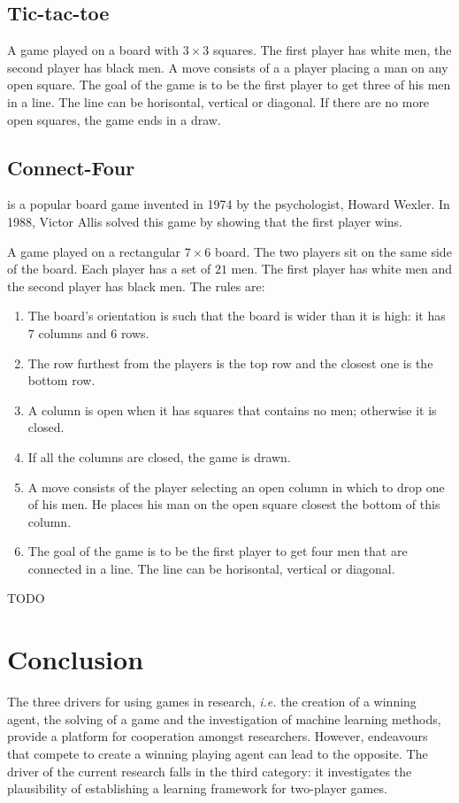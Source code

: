 \subsection{Tic-tac-toe}
 {A game played on a board with $3 \times 3$ squares.  The first player has white men, the second player has black men. A move consists of a a player placing a man on any open square.  The goal of the game is to be the first player to get three of his men in a line.  The line can be horisontal, vertical or diagonal.  If there are no more open squares, the game ends in a draw.}  

\subsection{Connect-Four}
 is a popular board game invented in 1974 by the psychologist, Howard Wexler.  In 1988, Victor Allis\cite{allis:masters} solved this game by showing that the first player wins.  

 {A game played on a rectangular $7 \times 6$ board. The two players sit on the same side of the board. Each player has a set of $21$ men.  The first player has white men and the second player has black men. The rules are:     
\begin{enumerate}
  \item The board's orientation is such that the board is wider than it is high: it has $7$ columns and $6$ rows.  
	\item The row furthest from the players is the top row and the closest one is the bottom row.
	\item A column is open when it has squares that contains no men; otherwise it is closed.
	\item If all the columns are closed, the game is drawn.
	\item A move consists of the player selecting an open column in which to drop one of his men.  He places his man on the open square closest the bottom of this column.  
	\item The goal of the game is to be the first player to get four men that are connected in a line.  The line can be horisontal, vertical or diagonal.
\end{enumerate}
}

TODO \cite{stenmark:masters}
\section{Conclusion}
\label{sec:two-player-conclusion}
The three drivers for using games in research, {\it i.e.} the creation of a winning agent, the solving of a game and the investigation of machine learning methods, provide a platform for cooperation amongst researchers.  However, endeavours that compete to create a winning playing agent can lead to the opposite.  The driver of the current research falls in the third category: it investigates the plausibility of establishing a learning framework for two-player games.

